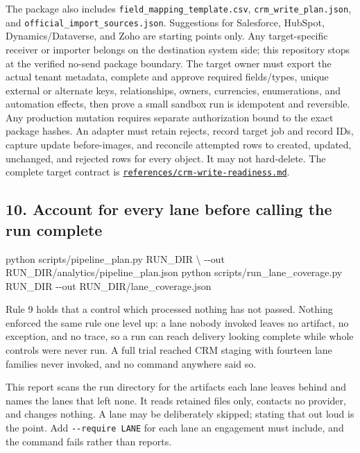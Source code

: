 \documentclass[
]{article}
\newenvironment{Shaded}{}{}
\newcommand{\AttributeTok}[1]{\textcolor[rgb]{0.49,0.56,0.16}{#1}}
\newcommand{\DataTypeTok}[1]{\textcolor[rgb]{0.56,0.13,0.00}{#1}}
\newcommand{\ExtensionTok}[1]{#1}
\newcommand{\NormalTok}[1]{#1}
\newcounter{none} %
\begin{document}
The package also includes
\texttt{field\_\allowbreak{}mapping\_\allowbreak{}template.csv},
\texttt{crm\_\allowbreak{}write\_\allowbreak{}plan.json}, and
\texttt{official\_\allowbreak{}import\_\allowbreak{}sources.json}.
Suggestions for Salesforce, HubSpot, Dynamics/Dataverse, and Zoho are
starting points only. Any target-specific receiver or importer belongs
on the destination system side; this repository stops at the verified
no-send package boundary. The target owner must export the actual tenant
metadata, complete and approve required fields/types, unique external or
alternate keys, relationships, owners, currencies, enumerations, and
automation effects, then prove a small sandbox run is idempotent and
reversible. Any production mutation requires separate authorization
bound to the exact package hashes. An adapter must retain rejects,
record target job and record IDs, capture update before-images, and
reconcile attempted rows to created, updated, unchanged, and rejected
rows for every object. It may not hard-delete. The complete target
contract is
\href{../references/crm-write-readiness.md}{\texttt{references/\allowbreak{}crm-\allowbreak{}write-\allowbreak{}readiness.md}}.

\subsection{10. Account for every lane before calling the run
complete}\label{account-for-every-lane-before-calling-the-run-complete}

\begin{Shaded}
\begin{Highlighting}[]
\ExtensionTok{python}\NormalTok{ scripts/pipeline\_plan.py RUN\_DIR }\DataTypeTok{\textbackslash{}}
  \AttributeTok{{-}{-}out}\NormalTok{ RUN\_DIR/analytics/pipeline\_plan.json}
\ExtensionTok{python}\NormalTok{ scripts/run\_lane\_coverage.py RUN\_DIR }\AttributeTok{{-}{-}out}\NormalTok{ RUN\_DIR/lane\_coverage.json}
\end{Highlighting}
\end{Shaded}

Rule 9 holds that a control which processed nothing has not passed.
Nothing enforced the same rule one level up: a lane nobody invoked
leaves no artifact, no exception, and no trace, so a run can reach
delivery looking complete while whole controls were never run. A full
trial reached CRM staging with fourteen lane families never invoked, and
no command anywhere said so.

This report scans the run directory for the artifacts each lane leaves
behind and names the lanes that left none. It reads retained files only,
contacts no provider, and changes nothing. A lane may be deliberately
skipped; stating that out loud is the point. Add
\texttt{-\/-require\ LANE} for each lane an engagement must include, and
the command fails rather than reports.
\end{document}
